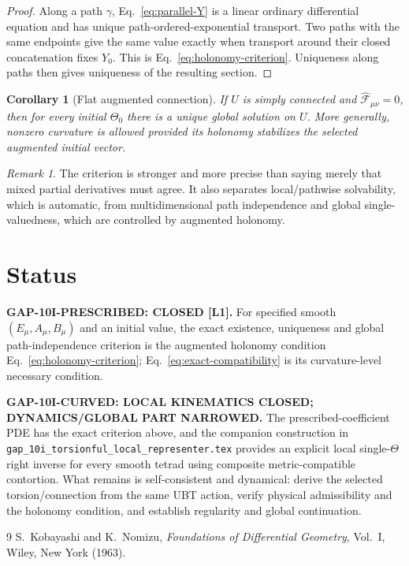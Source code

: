 \documentclass[12pt,a4paper]{article}
\newtheorem{corollary}[definition]{Corollary}
\theoremstyle{remark}\newtheorem{remark}[definition]{Remark}
\begin{document}
\begin{proof}
Along a path $\gamma$, Eq.~\eqref{eq:parallel-Y} is a linear ordinary
differential equation and has unique path-ordered-exponential transport.
Two paths with the same endpoints give the same value exactly when transport
around their closed concatenation fixes $Y_0$.  This is
Eq.~\eqref{eq:holonomy-criterion}.  Uniqueness along paths then gives
uniqueness of the resulting section.
\end{proof}

\begin{corollary}[Flat augmented connection]
If $U$ is simply connected and
$\widehat{\mathcal F}_{\mu\nu}=0$, then for every initial $\Theta_0$ there is a
unique global solution on $U$.  More generally, nonzero curvature is allowed
provided its holonomy stabilizes the selected augmented initial vector.
\end{corollary}

\begin{remark}
The criterion is stronger and more precise than saying merely that mixed
partial derivatives must agree.  It also separates local/pathwise solvability,
which is automatic, from multidimensional path independence and global
single-valuedness, which are controlled by augmented holonomy.
\end{remark}

\section{Status}
\begin{tcolorbox}[colback=green!6!white,colframe=green!55!black,title=Defensible status]
\textbf{GAP-10I-PRESCRIBED: CLOSED [L1].}
For specified smooth $(E_\mu,A_\mu,B_\mu)$ and an initial value, the exact
existence, uniqueness and global path-independence criterion is the augmented
holonomy condition Eq.~\eqref{eq:holonomy-criterion};
Eq.~\eqref{eq:exact-compatibility} is its curvature-level necessary condition.

\medskip
\textbf{GAP-10I-CURVED: LOCAL KINEMATICS CLOSED; DYNAMICS/GLOBAL PART NARROWED.}
The prescribed-coefficient PDE has the exact criterion above, and the companion
construction in \texttt{gap\_10i\_torsionful\_local\_representer.tex}
provides an explicit local single-$\Theta$ right inverse for every smooth
tetrad using composite metric-compatible contortion.  What remains is
self-consistent and dynamical: derive the selected torsion/connection from the
same UBT action, verify physical admissibility and the holonomy condition, and
establish regularity and global continuation.
\end{tcolorbox}

\begin{thebibliography}{9}
S.~Kobayashi and K.~Nomizu,
\emph{Foundations of Differential Geometry}, Vol.~I,
Wiley, New York (1963).
\end{thebibliography}
\end{document}
